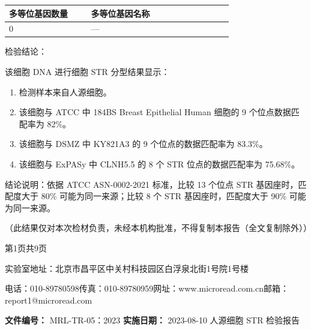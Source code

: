 \documentclass[UTF8,10pt,a4paper,fontset=fandol]{ctexart}
\newcommand{\fieldvalue}[1]{#1}
\begin{document}
\begin{center}
\begin{tabular}{|p{0.30\linewidth}|p{0.52\linewidth}|}
\hline
多等位基因数量 & 多等位基因名称 \\
\hline
\fieldvalue{0}
&
\fieldvalue{---}
\\
\hline
\end{tabular}
\end{center}

\noindent
检验结论：

\medskip

\noindent
该细胞 DNA 进行细胞 STR 分型结果显示：

\begin{enumerate}
\item 检测样本来自人源细胞。
\item 该细胞与 ATCC 中 184BS Breast Epithelial Human 细胞的 9 个位点数据匹配率为 82\%。
\item 该细胞与 DSMZ 中 KY821A3 的 9 个位点的数据匹配率为 83.3\%。
\item 该细胞与 ExPASy 中 CLNH5.5 的 8 个 STR 位点的数据匹配率为 75.68\%。
\end{enumerate}

\noindent
结论说明：依据 ATCC ASN-0002-2021 标准，比较 13 个位点 STR 基因座时，匹配度大于 80\% 可能为同一来源；比较 8 个 STR 基因座时，匹配度大于 90\% 可能为同一来源。

\vspace{0.5em}

\begin{center}
（此结果仅对本次检材负责，未经本机构批准，不得复制本报告（全文复制除外））
\end{center}

\vfill

\begin{center}
第1页共9页

实验室地址：北京市昌平区中关村科技园区白浮泉北街1号院1号楼

电话：010-89780598\quad 传真：010-89780959\quad 网址：www.microread.com.cn\quad 邮箱：report1@microread.com
\end{center}

\newpage

\noindent
\textbf{文件编号：}%
\fieldvalue{MRL-TR-05：2023}
\hfill
\textbf{实施日期：}%
\fieldvalue{2023-08-10}
\hfill
人源细胞 STR 检验报告
\end{document}
